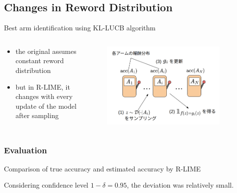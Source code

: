 \documentclass[aspectratio=169]{slide-en}
\begin{document}
\subsection{Changes in Reword Distribution}

\begin{frame}{}
  Best arm identification using KL-LUCB algorithm
  \begin{columns}[]
    \begin{column}{0.65\textwidth}
      \begin{itemize}
        \item the original assumes constant reword distribution
        \item but in R-LIME, it changes with every update of the model after sampling
      \end{itemize}
    \end{column}
    \begin{column}{0.4\textwidth}
      \begin{figure}
        \centering
        \includegraphics[width=0.9\textwidth]{bandit}
      \end{figure}
    \end{column}
  \end{columns}
\end{frame}

\subsubsection{Evaluation}

\begin{frame}{}
  \begin{table}
    
    \caption{Comparison of true accuracy and estimated accuracy by R-LIME}
  \end{table}

  Considering confidence level $1-\delta=0.95$,
  the deviation was relatively small.
\end{frame}
\end{document}
